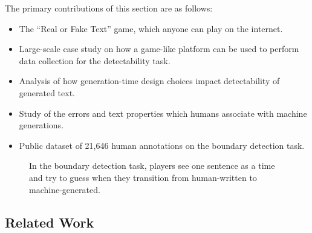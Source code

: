 The primary contributions of this section are as follows:
\begin{itemize}[itemsep=0.5pt,topsep=1pt]
    \item The ``Real or Fake Text'' game, which anyone can play on the internet.
    \item Large-scale case study on how a game-like platform can be used to perform data collection for the detectability task.
    \item Analysis of how generation-time design choices impact detectability of generated text. 
    \item Study of the errors and text properties which humans associate with machine generations.
    \item Public dataset of 21,646 human annotations on the boundary detection task.
\end{itemize}

\begin{figure}[tb]
    \centering
    \caption{In the boundary detection task, players see one sentence as a time and try to guess when they transition from human-written to machine-generated.}
    \label{fig:pg1}
\end{figure}

\subsection{Related Work}

